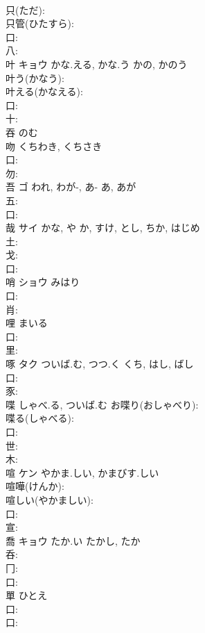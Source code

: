 \documentclass[8pt]{extreport}
\begin{document}
\begin{CJK}{UTF8}{min}
\\	只(ただ): 
\\	只管(ひたすら): 
\\	口: 
\\	八: 
\\	叶	キョウ	かな.える, かな.う	かの, かのう	
\\	叶う(かなう): 
\\	叶える(かなえる): 
\\	口: 
\\	十: 
\\	吞		のむ				
\\	吻		くちわき, くちさき				
\\	口: 
\\	勿: 
\\	吾	ゴ	われ, わが-, あ-	あ, あが	
\\	五: 
\\	口: 
\\	哉	サイ	かな, や	か, すけ, とし, ちか, はじめ	
\\	土: 
\\	戈: 
\\	口: 
\\	哨	ショウ	みはり		
\\	口: 
\\	肖: 
\\	哩		まいる				
\\	口: 
\\	里: 
\\	啄	タク	ついば.む, つつ.く	くち, はし, ばし	
\\	口: 
\\	豕: 
\\	喋		しゃべ.る, ついば.む			お喋り(おしゃべり): 
\\	喋る(しゃべる): 
\\	口: 
\\	世: 
\\	木: 
\\	喧	ケン	やかま.しい, かまびす.しい		
\\	喧嘩(けんか): 
\\	喧しい(やかましい): 
\\	口: 
\\	宣: 
\\	喬	キョウ	たか.い	たかし, たか	
\\	呑: 
\\	冂: 
\\	口: 
\\	單		ひとえ				
\\	口: 
\\	口: 

\end{CJK}
\end{document}
